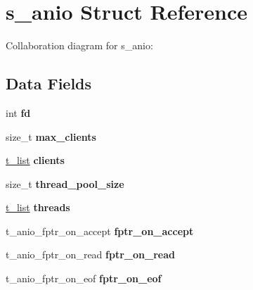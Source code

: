 \hypertarget{structs__anio}{}\section{s\+\_\+anio Struct Reference}
\label{structs__anio}


Collaboration diagram for s\+\_\+anio\+:
\subsection*{Data Fields}
\begin{DoxyCompactItemize}
\item 
\hypertarget{structs__anio_a02c3ef33c4789ab890b7316bb0907076}{}int {\bfseries fd}\label{structs__anio_a02c3ef33c4789ab890b7316bb0907076}

\item 
\hypertarget{structs__anio_a3fdf66c04e31cb75fe982160c4846d7e}{}size\+\_\+t {\bfseries max\+\_\+clients}\label{structs__anio_a3fdf66c04e31cb75fe982160c4846d7e}

\item 
\hypertarget{structs__anio_a8a7357c39c829f1fa66ddac440f3377d}{}\hyperlink{structs__list}{t\+\_\+list} {\bfseries clients}\label{structs__anio_a8a7357c39c829f1fa66ddac440f3377d}

\item 
\hypertarget{structs__anio_a72eaf48aa3edb9a1f6cd9d7e85f0b2f2}{}size\+\_\+t {\bfseries thread\+\_\+pool\+\_\+size}\label{structs__anio_a72eaf48aa3edb9a1f6cd9d7e85f0b2f2}

\item 
\hypertarget{structs__anio_af2225874d23473461a4300666dd482be}{}\hyperlink{structs__list}{t\+\_\+list} {\bfseries threads}\label{structs__anio_af2225874d23473461a4300666dd482be}

\item 
\hypertarget{structs__anio_a18b6ac10276e44a6807c618b2ea5a7fd}{}t\+\_\+anio\+\_\+fptr\+\_\+on\+\_\+accept {\bfseries fptr\+\_\+on\+\_\+accept}\label{structs__anio_a18b6ac10276e44a6807c618b2ea5a7fd}

\item 
\hypertarget{structs__anio_a2f2478bbfc29ce07de6e75104bea6880}{}t\+\_\+anio\+\_\+fptr\+\_\+on\+\_\+read {\bfseries fptr\+\_\+on\+\_\+read}\label{structs__anio_a2f2478bbfc29ce07de6e75104bea6880}

\item 
\hypertarget{structs__anio_a05480be803c2910ea0693fb39a8f5242}{}t\+\_\+anio\+\_\+fptr\+\_\+on\+\_\+eof {\bfseries fptr\+\_\+on\+\_\+eof}\label{structs__anio_a05480be803c2910ea0693fb39a8f5242}


\end{DoxyCompactItemize}
